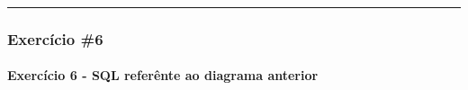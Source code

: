 \documentclass[
]{book}
\makeatletter
\newcommand*\pandocbounded[1]{%
  \sbox\pandoc@box{#1}%
  \Gscale@div\@tempa{\textheight}{\dimexpr\ht\pandoc@box+\dp\pandoc@box\relax}%
  \Gscale@div\@tempb{\linewidth}{\wd\pandoc@box}%
  \ifdim\@tempb\p@<\@tempa\p@\let\@tempa\@tempb\fi%
  \ifdim\@tempa\p@<\p@\scalebox{\@tempa}{\usebox\pandoc@box}%
  \else\usebox{\pandoc@box}%
  \fi%
}
\makeatother
\begin{document}
\begin{center}\rule{0.5\linewidth}{0.5pt}\end{center}

\subsubsection{Exercício \#6}\label{exercuxedcio-6-1}

\pandocbounded{}

\paragraph{Exercício 6 - SQL referênte ao diagrama anterior}\label{exercuxedcio-6---sql-referuxeante-ao-diagrama-anterior-1}
\end{document}
